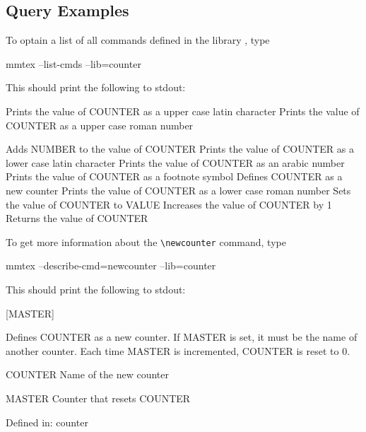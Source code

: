 \documentclass{webpage}
\begin{document}
\subsection{Query Examples}

To optain a list of all commands defined in the library , type

\begin{preformatted}[code]%
mmtex --list-cmds --lib=counter
\end{preformatted}

This should print the following to stdout:

\verbatim[code]
\Alph                Prints the value of COUNTER as a upper case latin character
\Roman               Prints the value of COUNTER as a upper case roman number
\addtocounter        Adds NUMBER to the value of COUNTER
\alph                Prints the value of COUNTER as a lower case latin character
\arabic              Prints the value of COUNTER as an arabic number
\fnsymbol            Prints the value of COUNTER as a footnote symbol
\newcounter          Defines COUNTER as a new counter
\roman               Prints the value of COUNTER as a lower case roman number
\setcounter          Sets the value of COUNTER to VALUE
\stepcounter         Increases the value of COUNTER by 1
\value               Returns the value of COUNTER
\endverbatim

To get more information about the \verb'\newcounter' command, type

\begin{preformatted}[code]%
mmtex --describe-cmd=newcounter --lib=counter
\end{preformatted}

This should print the following to stdout:

\verbatim[code]
[MASTER]

  Defines COUNTER as a new counter. If MASTER is set, it must be the name of
  another counter. Each time MASTER is incremented, COUNTER is reset to 0.

  COUNTER   Name of the new counter

  MASTER    Counter that resets COUNTER

  Defined in: counter
\endverbatim
\end{document}
